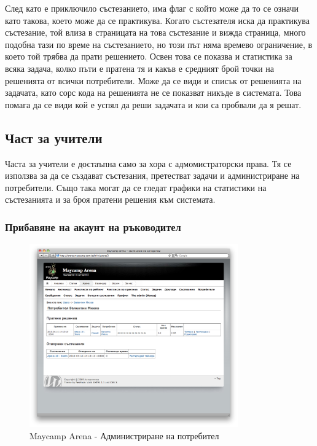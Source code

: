 \documentclass[a4paper,12pt]{article}
\begin{document}
  След като е приключило състезанието, има флаг с който може да то се означи като такова, което може да се практикува. Когато състезателя иска да практикува състезание, той влиза в страницата на това състезание и вижда страница, много подобна тази по време на състезанието, но този път няма времево ограничение, в което той трябва да прати решението. Освен това се показва и статистика за всяка задача, колко пъти е пратена тя и какъв е средният брой точки на решенията от всички потребители. Може да се види и списък от решенията на задачата, като сорс кода на решенията не се показват никъде в системата. Това помага да се види кой е успял да реши задачата и кои са пробвали да я решат.
  
  \subsection{Част за учители}

  Часта за учители е достаъпна само за хора с адмомистраторски права. Тя се използва за да се създават състезания, претестват задачи и администриране на потребители. Също така могат да се гледат графики на статистики на състезанията и за броя пратени решения към системата.
  
  \subsubsection{Прибавяне на акаунт на ръководител}

  \begin{figure}[ht]
    \begin{center}
      \includegraphics[width=0.8\textwidth]{maycamp_arena_admin_user.png}
    \end{center}
    \caption{Maycamp Arena - Администриране на потребител}
    \label{arena_admin_user}
  \end{figure}
\end{document}
